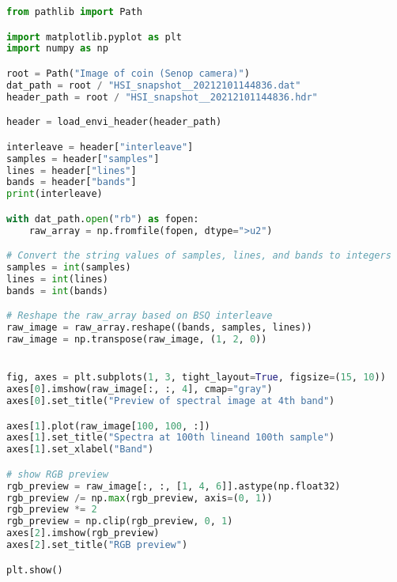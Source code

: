 \begin{lstlisting}[language=python, caption=Load spectral image of coin, label={code:load-coin}]
from pathlib import Path

import matplotlib.pyplot as plt
import numpy as np

root = Path("Image of coin (Senop camera)")
dat_path = root / "HSI_snapshot__20212101144836.dat"
header_path = root / "HSI_snapshot__20212101144836.hdr"

header = load_envi_header(header_path)

interleave = header["interleave"]
samples = header["samples"]
lines = header["lines"]
bands = header["bands"]
print(interleave)

with dat_path.open("rb") as fopen:
    raw_array = np.fromfile(fopen, dtype=">u2")

# Convert the string values of samples, lines, and bands to integers
samples = int(samples)
lines = int(lines)
bands = int(bands)

# Reshape the raw_array based on BSQ interleave
raw_image = raw_array.reshape((bands, samples, lines))
raw_image = np.transpose(raw_image, (1, 2, 0))


fig, axes = plt.subplots(1, 3, tight_layout=True, figsize=(15, 10))
axes[0].imshow(raw_image[:, :, 4], cmap="gray")
axes[0].set_title("Preview of spectral image at 4th band")

axes[1].plot(raw_image[100, 100, :])
axes[1].set_title("Spectra at 100th lineand 100th sample")
axes[1].set_xlabel("Band")

# show RGB preview
rgb_preview = raw_image[:, :, [1, 4, 6]].astype(np.float32)
rgb_preview /= np.max(rgb_preview, axis=(0, 1))
rgb_preview *= 2
rgb_preview = np.clip(rgb_preview, 0, 1)
axes[2].imshow(rgb_preview)
axes[2].set_title("RGB preview")

plt.show()
\end{lstlisting}